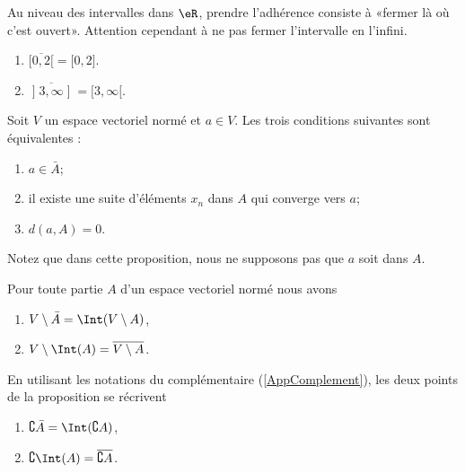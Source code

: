 \begin{example}
	Au niveau des intervalles dans $\eR$, prendre l'adhérence consiste à «fermer là où c'est ouvert». Attention cependant à ne pas fermer l'intervalle en l'infini.
	\begin{enumerate}
		\item
		      $\overline{ \mathopen[ 0 , 2 [ }=\mathopen[ 0 , 2 \mathclose]$.
		\item
		      $\overline{ \mathopen] 3 , \infty \mathopen] }=\mathopen[ 3 , \infty [$.
	\end{enumerate}
\end{example}

\begin{proposition}
	Soit $V$ un espace vectoriel normé et $a\in V$. Les trois conditions suivantes sont équivalentes :
	\begin{enumerate}
		\item
		      $a\in\bar A$;
		\item
		      il existe une suite d'éléments $x_n$ dans $A$ qui converge vers $a$;
		\item
		      $d(a,A)=0$.
	\end{enumerate}
\end{proposition}
Notez que dans cette proposition, nous ne supposons pas que $a$ soit dans $A$.

\begin{proposition}		\label{PropComleIntBar}
	Pour toute partie $A$ d'un espace vectoriel normé nous avons
	\begin{enumerate}
		\item
		      $V\setminus\bar A=\Int(V\setminus A)$,
		\item
		      $V\setminus\Int(A)=\overline{ V\setminus A }$.
	\end{enumerate}
\end{proposition}

En utilisant les notations du complémentaire (\ref{AppComplement}), les deux points de la proposition se récrivent
\begin{enumerate}
	\item
	      $\complement \bar A=\Int(\complement A)$,
	\item\label{ItemLemPropComplementiv}
	      $\complement\Int(A)=\overline{ \complement A }$.
\end{enumerate}

